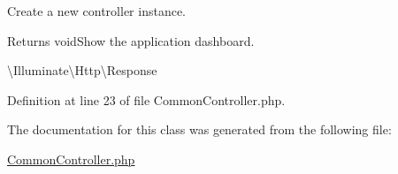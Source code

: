 Create a new controller instance.

\begin{DoxyReturn}{Returns}
void\+Show the application dashboard.

\textbackslash{}\+Illuminate\textbackslash{}\+Http\textbackslash{}\+Response 
\end{DoxyReturn}


Definition at line 23 of file Common\+Controller.\+php.



The documentation for this class was generated from the following file\+:\begin{DoxyCompactItemize}
\item 
\mbox{\hyperlink{_common_controller_8php}{Common\+Controller.\+php}}\end{DoxyCompactItemize}
